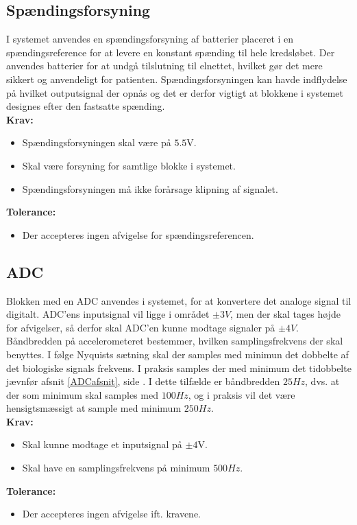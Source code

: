 \subsection{Spændingsforsyning}
I systemet anvendes en spændingsforsyning af batterier placeret i en spændingsreference for at levere en konstant spænding til hele kredsløbet. Der anvendes batterier for at undgå tilslutning til elnettet, hvilket gør det mere sikkert og anvendeligt for patienten. Spændingsforsyningen kan havde indflydelse på hvilket outputsignal der opnås og det er derfor vigtigt at blokkene i systemet designes efter den fastsatte spænding. \\
\noindent\textbf{Krav:}
\begin{itemize}
\item Spændingsforsyningen skal være på $5.5$V.
\item Skal være forsyning for samtlige blokke i systemet.
\item Spændingsforsyningen må ikke forårsage klipning af signalet.
\end{itemize}
\noindent\textbf{Tolerance:}
\begin{itemize}
\item Der accepteres ingen afvigelse for spændingsreferencen.
\end{itemize}

\subsection{ADC}
Blokken med en ADC anvendes i systemet, for at konvertere det analoge signal til digitalt. %
ADC'ens inputsignal vil ligge i området $\pm3V$, men der skal tages højde for afvigelser, så derfor skal ADC'en kunne modtage signaler på $\pm4V$. Båndbredden på accelerometeret bestemmer, hvilken samplingsfrekvens der skal benyttes. I følge Nyquists sætning skal der samples med minimun det dobbelte af det biologiske signals frekvens. I praksis samples der med minimum det tidobbelte jævnfør afsnit \ref{ADCafsnit}, side \pageref{ADCafsnit}. I dette tilfælde er båndbredden $25Hz$, dvs. at der som minimum skal samples med $100Hz$, og i praksis vil det være hensigtsmæssigt at sample med minimum $250Hz$. \\
\textbf{Krav:}
\begin{itemize}
	\item Skal kunne modtage et inputsignal på $\pm4$V.
	\item Skal have en samplingsfrekvens på minimum $500Hz$.
\end{itemize}
\textbf{Tolerance:}
\begin{itemize}
	\item Der accepteres ingen afvigelse ift. kravene.
\end{itemize}
